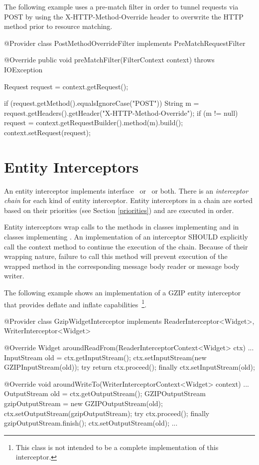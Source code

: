 The following example uses a pre-match filter in order to tunnel requests via POST by using the X-HTTP-Method-Override header to overwrite the HTTP method prior to resource matching.

\begin{listing}{1}
@Provider
class PostMethodOverrideFilter implements PreMatchRequestFilter {

  @Override
  public void preMatchFilter(FilterContext context) throws IOException {
    Request request = context.getRequest();
        
    if (request.getMethod().equalsIgnoreCase("POST")) {
      String m = request.getHeaders().getHeader("X-HTTP-Method-Override");
      if (m != null) {
        request = context.getRequestBuilder().method(m).build();
        context.setRequest(request);
      }
    }
  }
}
\end{listing}

\section{Entity Interceptors}

An entity interceptor implements interface \ReaderInterceptor\ or \WriterInterceptor\ or both. There is an \emph{interceptor chain} for each kind of entity interceptor. Entity interceptors in a chain are sorted based on their priorities (see Section \ref{priorities}) and are executed in order. 

Entity interceptors wrap calls to the methods  in classes implementing  and  in classes implementing . An implementation of an interceptor SHOULD explicitly call the context method  to continue the execution of the chain. Because of their wrapping nature, failure to call this method will prevent execution of the wrapped method in the corresponding message body reader or message body writer.

The following example shows an implementation of a GZIP entity interceptor that provides deflate and inflate capabilities~\footnote{This class is not intended to be a complete implementation of this interceptor.}.

\begin{listing}{1}
@Provider
class GzipWidgetInterceptor implements 
    ReaderInterceptor<Widget>, WriterInterceptor<Widget> {

    @Override
    Widget aroundReadFrom(ReaderInterceptorContext<Widget> ctx) ... {
        InputStream old = ctx.getInputStream();
        ctx.setInputStream(new GZIPInputStream(old));
        try {
            return ctx.proceed();
        } finally {
            ctx.setInputStream(old);
        }
    }

    @Override
    void aroundWriteTo(WriterInterceptorContext<Widget> context) ... {
        OutputStream old = ctx.getOutputStream();
        GZIPOutputStream gzipOutputStream = new GZIPOutputStream(old);
        ctx.setOutputStream(gzipOutputStream);
        try {
            ctx.proceed();
        } finally {
            gzipOutputStream.finish();
            ctx.setOutputStream(old);
        }
    }
    ...
}
\end{listing}

